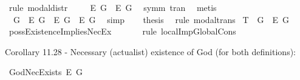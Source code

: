 \begin{isabellebody}
\ {\isacharparenleft}rule\ modal{\isacharunderscore}distr{\isacharparenright}\isanewline
\ \ \isamarkupfalse%
\ {}{\isacharcolon}\ {\isachardoublequoteopen}{\isasymlfloor}\isactrlbold {\isasymdiamond}\isactrlbold {\isasymbox}\isactrlbold {\isasymexists}\isactrlsup E\ G\ \isactrlbold {\isasymrightarrow}\ \isactrlbold {\isasymbox}\isactrlbold {\isasymexists}\isactrlsup E\ G{\isasymrfloor}{\isachardoublequoteclose}\ \isamarkupfalse%
\ symm\ tran\ \isamarkupfalse%
\ metis\ %
\isanewline
\ \ \isamarkupfalse%
\ {}\ {}\ \isamarkupfalse%
\ {\isachardoublequoteopen}{\isasymlfloor}\isactrlbold {\isasymdiamond}\isactrlbold {\isasymexists}\ G\ \isactrlbold {\isasymrightarrow}\ \isactrlbold {\isasymdiamond}\isactrlbold {\isasymbox}\isactrlbold {\isasymexists}\isactrlsup E\ G{\isasymrfloor}\ {\isasymand}\ {\isasymlfloor}\isactrlbold {\isasymdiamond}\isactrlbold {\isasymbox}\isactrlbold {\isasymexists}\isactrlsup E\ G\ \isactrlbold {\isasymrightarrow}\ \isactrlbold {\isasymbox}\isactrlbold {\isasymexists}\isactrlsup E\ G{\isasymrfloor}{\isachardoublequoteclose}\ \isamarkupfalse%
\ simp\isanewline
\ \ \isamarkupfalse%
\ {\isacharquery}thesis\ \isamarkupfalse%
\ {\isacharparenleft}rule\ modal{\isacharunderscore}trans{\isacharparenright}\isanewline
{}\isamarkupfalse%
%
\endisatagproof
{\isafoldproof}%
%
\isadelimproof
\isanewline
%
\endisadelimproof
\isanewline
{}\isamarkupfalse%
\ T{}{\isacharcolon}\ {\isachardoublequoteopen}{\isasymlfloor}\isactrlbold {\isasymdiamond}\isactrlbold {\isasymexists}\ G{\isasymrfloor}\ {\isasymlongrightarrow}\ {\isasymlfloor}\isactrlbold {\isasymbox}\isactrlbold {\isasymexists}\isactrlsup E\ G{\isasymrfloor}{\isachardoublequoteclose}%
\isadelimproof
\ %
\endisadelimproof
%
\isatagproof
{}\isamarkupfalse%
\ possExistenceImpliesNecEx\ \isanewline
\ \ \ \ \isamarkupfalse%
\ {\isacharparenleft}rule\ localImpGlobalCons{\isacharparenright}\ \ %
%
\endisatagproof
{\isafoldproof}%
%
\isadelimproof
%
\endisadelimproof
%
\begin{isamarkuptext}%
Corollary 11.28 - Necessary (actualist) existence of God (for both definitions):%
\end{isamarkuptext}\isamarkuptrue%
\isamarkupfalse%
\ GodNecExists{\isacharcolon}\ {\isachardoublequoteopen}{\isasymlfloor}\isactrlbold {\isasymbox}\isactrlbold {\isasymexists}\isactrlsup E\ G{\isasymrfloor}{\isachardoublequoteclose}%

\end{isabellebody}
